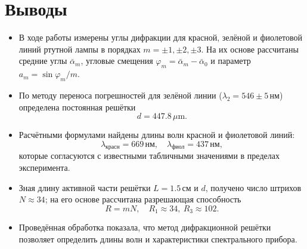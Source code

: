 \section{Выводы}

\begin{itemize}
	\item В ходе работы измерены углы дифракции для красной, зелёной и фиолетовой линий ртутной лампы в порядках $m=\pm1,\pm2,\pm3$. На их основе рассчитаны средние углы $\bar\alpha_{m}$, угловые смещения $\varphi_{m}=\bar\alpha_{m}-\bar\alpha_{0}$ и параметр $a_m=\sin\varphi_m/m$.

	\item По методу переноса погрешностей для зелёной линии ($\lambda_2=546\pm5\,$нм) определена постоянная решётки
	      \[
		      d = 447.8\,\mu\mathrm{m}.
	      \]

	\item Расчётными формулами найдены длины волн красной и фиолетовой линий:
	      \[
		      \lambda_\mathrm{\text{красн}} = 669\,\mathrm{\text{нм}},
		      \quad
		      \lambda_\mathrm{\text{фиол}} = 437\,\mathrm{\text{нм}},
	      \]
	      которые согласуются с известными табличными значениями в пределах эксперимента.

	\item Зная длину активной части решётки $L=1.5\,$см и $d$, получено число штрихов $N\approx34$; на его основе рассчитана разрешающая способность
	      \[
		      R = mN,\quad R_1\approx34,\ R_3\approx102.
	      \]

	\item Проведённая обработка показала, что метод дифракционной решётки позволяет определить длины волн и характеристики спектрального прибора.
\end{itemize}
